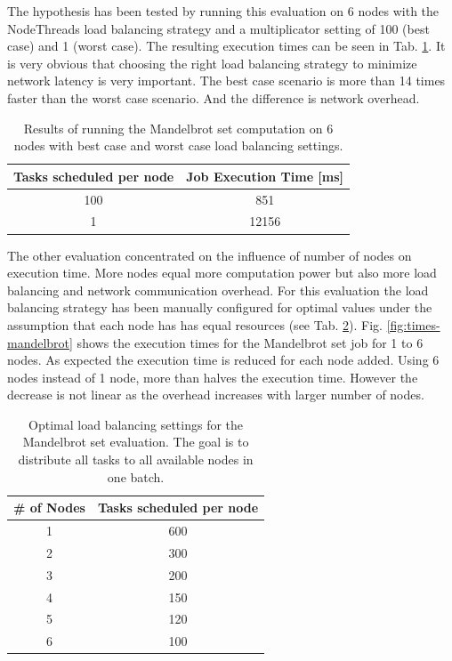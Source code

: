 \documentclass[12pt]{article}
\begin{document}
The hypothesis has been tested by running this evaluation on 6 nodes with the NodeThreads load balancing strategy and a multiplicator setting of 100 (best case) and 1 (worst case). The resulting execution times can be seen in Tab. \ref{tab:mandelbrot-lb-res}. It is very obvious that choosing the right load balancing strategy to minimize network latency is very important. The best case scenario is more than 14 times faster than the worst case scenario. And the difference is network overhead.

\begin{table}[h!]
\centering
\begin{tabular}{|c|c|}
\hline
\textbf{Tasks scheduled per node} & \textbf{Job Execution Time [ms]} \\ \hline
100 & 851 \\ \hline
1 & 12156 \\ \hline
\end{tabular}
\caption{Results of running the Mandelbrot set computation on 6 nodes with best case and worst case load balancing settings.}
\label{tab:mandelbrot-lb-res}
\end{table}

The other evaluation concentrated on the influence of number of nodes on execution time. More nodes equal more computation power but also more load balancing and network communication overhead. For this evaluation the load balancing strategy has been manually configured for optimal values under the assumption that each node has has equal resources (see Tab. \ref{tab:mandelbrot-lb}). Fig. \ref{fig:times-mandelbrot} shows the execution times for the Mandelbrot set job for 1 to 6 nodes. As expected the execution time is reduced for each node added. Using 6 nodes instead of 1 node, more than halves the execution time. However the decrease is not linear as the overhead increases with larger number of nodes.

\begin{table}[h!]
\centering
\begin{tabular}{|c|c|}
\hline
\textbf{\# of Nodes} & \textbf{Tasks scheduled per node} \\ \hline
1 & 600 \\ \hline
2 & 300 \\ \hline
3 & 200 \\ \hline
4 & 150 \\ \hline
5 & 120 \\ \hline
6 & 100 \\ \hline
\end{tabular}
\caption{Optimal load balancing settings for the Mandelbrot set evaluation. The goal is to distribute all tasks to all available nodes in one batch.}
\label{tab:mandelbrot-lb}
\end{table}
\end{document}
